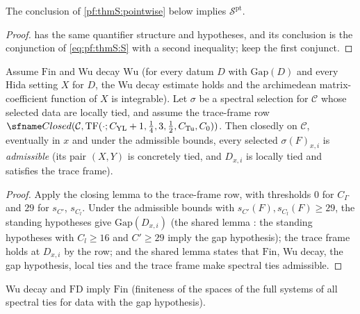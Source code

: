 \begin{lemma}\label{pf:thmS:distinctlemma}
The conclusion of \cref{pf:thmS:pointwise} below implies $\mathcal{S}^{\mathrm{pt}}$.
\end{lemma}

\begin{proof}
 has the same quantifier structure and hypotheses, and its conclusion is the conjunction of
\eqref{eq:pf:thmS:S} with a second inequality; keep the first conjunct.
\end{proof}

\begin{lemma}\label{pf:thmS:selok}
Assume $\mathrm{Fin}$ and Wu decay $\mathrm{Wu}$ (for every datum $D$ with $\mathrm{Gap}(D)$ and every
Hida setting $X$ for $D$, the Wu decay estimate holds and the archimedean matrix-coefficient function of $X$ is
integrable). Let $\sigma$ be a spectral selection for $\mathcal C$ whose selected data are locally tied, and assume the
trace-frame row $\thmSClosed(\mathcal C,\mathrm{TF}(\cdot;C_{\mathrm{YL}}+1,\tfrac14,3,\tfrac12,C_{\mathrm{Tu}},C_0))$.
Then closedly on $\mathcal C$, eventually in $x$ and under the admissible bounds, every selected $\sigma(F)_{x,i}$ is
\emph{admissible} (its pair $(X,Y)$ is concretely tied, and $D_{x,i}$ is locally tied and satisfies
the trace frame).
\end{lemma}

\begin{proof}
Apply the closing lemma  to the trace-frame row, with thresholds $0$ for
$C_\Gamma$ and $29$ for $s_{C'}$, $s_{C_l}$. Under the admissible bounds with $s_{C'}(F),s_{C_l}(F)\ge29$, the standing hypotheses
give $\mathrm{Gap}(D_{x,i})$ (the shared lemma :
the standing hypotheses with $C_l\ge16$ and $C'\ge29$ imply the gap hypothesis); the
trace frame holds at $D_{x,i}$ by the row; and the shared lemma  states
that $\mathrm{Fin}$, Wu decay, the gap hypothesis, local ties and the trace frame make spectral ties admissible.
\end{proof}

\begin{lemma}\label{pf:thmS:finxc}
Wu decay and $\mathrm{FD}$ imply $\mathrm{Fin}$ (finiteness of the spaces of the full systems of all spectral
ties for data with the gap hypothesis).
\end{lemma}

